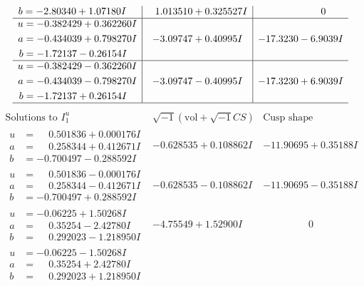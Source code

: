 \documentclass[1p]{elsarticle_modified}
\theoremstyle{definition}
\newcommand{\I}{\sqrt{-1}}
\begin{document}
$$\begin{array}{c|c|c}
\begin{aligned}
b &= -2.80340 + 1.07180 I\end{aligned}
 & \phantom{-}1.013510 + 0.325527 I & \phantom{-0.000000 } 0 \\ \hline\begin{aligned}
u &= -0.382429 + 0.362260 I \\
a &= -0.434039 + 0.798270 I \\
b &= -1.72137 - 0.26154 I\end{aligned}
 & -3.09747 + 0.40995 I & -17.3230 - 6.9039 I \\ \hline\begin{aligned}
u &= -0.382429 - 0.362260 I \\
a &= -0.434039 - 0.798270 I \\
b &= -1.72137 + 0.26154 I\end{aligned}
 & -3.09747 - 0.40995 I & -17.3230 + 6.9039 I\\
 \hline 
 \end{array}$$\newpage$$\begin{array}{c|c|c}  
\text{Solutions to }I^u_{1}& \I (\text{vol} + \sqrt{-1}CS) & \text{Cusp shape}\\
 \hline 
\begin{aligned}
u &= \phantom{-}0.501836 + 0.000176 I \\
a &= \phantom{-}0.258344 + 0.412671 I \\
b &= -0.700497 - 0.288592 I\end{aligned}
 & -0.628535 + 0.108862 I & -11.90695 + 0.35188 I \\ \hline\begin{aligned}
u &= \phantom{-}0.501836 - 0.000176 I \\
a &= \phantom{-}0.258344 - 0.412671 I \\
b &= -0.700497 + 0.288592 I\end{aligned}
 & -0.628535 - 0.108862 I & -11.90695 - 0.35188 I \\ \hline\begin{aligned}
u &= -0.06225 + 1.50268 I \\
a &= \phantom{-}0.35254 - 2.42780 I \\
b &= \phantom{-}0.292023 - 1.218950 I\end{aligned}
 & -4.75549 + 1.52900 I & \phantom{-0.000000 } 0 \\ \hline\begin{aligned}
u &= -0.06225 - 1.50268 I \\
a &= \phantom{-}0.35254 + 2.42780 I \\
b &= \phantom{-}0.292023 + 1.218950 I\end{aligned}

\end{array}$$
\end{document}
